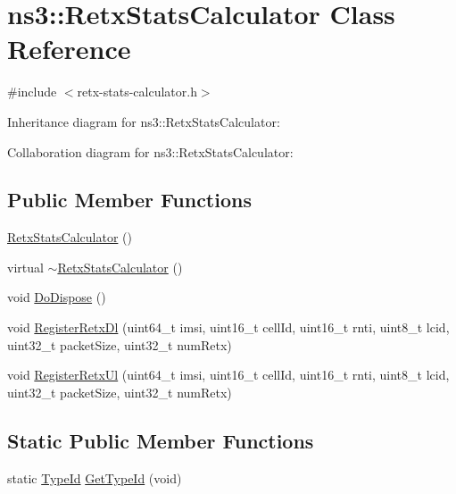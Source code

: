 \hypertarget{classns3_1_1RetxStatsCalculator}{}\section{ns3\+:\+:Retx\+Stats\+Calculator Class Reference}
\label{classns3_1_1RetxStatsCalculator}


{\ttfamily \#include $<$retx-\/stats-\/calculator.\+h$>$}



Inheritance diagram for ns3\+:\+:Retx\+Stats\+Calculator\+:


Collaboration diagram for ns3\+:\+:Retx\+Stats\+Calculator\+:
\subsection*{Public Member Functions}
\begin{DoxyCompactItemize}
\item 
\hyperlink{classns3_1_1RetxStatsCalculator_aa05ebf7bc75674ead6bec445100b06c3}{Retx\+Stats\+Calculator} ()
\item 
virtual \hyperlink{classns3_1_1RetxStatsCalculator_aad59269cd37a5e682ac3544321c591a7}{$\sim$\+Retx\+Stats\+Calculator} ()
\item 
void \hyperlink{classns3_1_1RetxStatsCalculator_ad270dd1474e90de265b73878eb88ea07}{Do\+Dispose} ()
\item 
void \hyperlink{classns3_1_1RetxStatsCalculator_aee169846a33a0ffa267c09eba98be0d4}{Register\+Retx\+Dl} (uint64\+\_\+t imsi, uint16\+\_\+t cell\+Id, uint16\+\_\+t rnti, uint8\+\_\+t lcid, uint32\+\_\+t packet\+Size, uint32\+\_\+t num\+Retx)
\item 
void \hyperlink{classns3_1_1RetxStatsCalculator_ae610c6b6f27969510e7c9b3687775c23}{Register\+Retx\+Ul} (uint64\+\_\+t imsi, uint16\+\_\+t cell\+Id, uint16\+\_\+t rnti, uint8\+\_\+t lcid, uint32\+\_\+t packet\+Size, uint32\+\_\+t num\+Retx)
\end{DoxyCompactItemize}
\subsection*{Static Public Member Functions}
\begin{DoxyCompactItemize}
\item 
static \hyperlink{classns3_1_1TypeId}{Type\+Id} \hyperlink{classns3_1_1RetxStatsCalculator_a66b31044b7cc00864f5f0b5c117be33b}{Get\+Type\+Id} (void)
\end{DoxyCompactItemize}

